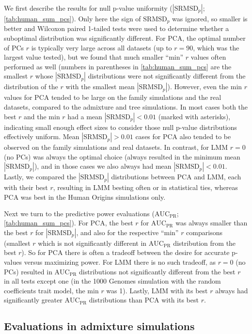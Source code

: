 \documentclass[11pt]{article}
\newcommand{\rmsd}{\text{SRMSD}_p}
\newcommand{\auc}{\text{AUC}_\text{PR}}
\begin{document}
We first describe the results for null p-value uniformity ($|\rmsd|$; \cref{tab:human_sum_pcs}).
Only here the sign of $\rmsd$ was ignored, so smaller is better and Wilcoxon paired 1-tailed tests were used to determine whether a suboptimal distribution was significantly different.
For PCA, the optimal number of PCs $r$ is typically very large across all datasets (up to $r=90$, which was the largest value tested), but we found that much smaller ``min'' $r$ values often performed as well (numbers in parentheses in \cref{tab:human_sum_pcs} are the smallest $r$ whose $|\rmsd|$ distributions were not significantly different from the distribution of the $r$ with the smallest mean $|\rmsd|$).
However, even the min $r$ values for PCA tended to be large on the family simulations and the real datasets, compared to the admixture and tree simulations.
In most cases both the best $r$ and the min $r$ had a mean $|\rmsd| < 0.01$ (marked with asterisks), indicating small enough effect sizes to consider those null p-value distributions effectively uniform.
Mean $|\rmsd| > 0.01$ cases for PCA also tended to be observed on the family simulations and real datasets.
In contrast, for LMM $r=0$ (no PCs) was always the optimal choice (always resulted in the minimum mean $|\rmsd|$), and in those cases we also always had mean $|\rmsd| < 0.01$.
Lastly, we compared the $|\rmsd|$ distributions between PCA and LMM, each with their best $r$, resulting in LMM besting often or in statistical ties, whereas PCA was best in the Human Origins simulations only.

Next we turn to the predictive power evaluations ($\auc$; \cref{tab:human_sum_pcs}).
For PCA, the best $r$ for $\auc$ was always smaller than the best $r$ for $|\rmsd|$, and also for the respective ``min'' $r$ comparisons (smallest $r$ which is not significantly different in $\auc$ distribution from the best $r$).
So for PCA there is often a tradeoff between the desire for accurate p-values versus maximizing power.
For LMM there is no such tradeoff, as $r=0$ (no PCs) resulted in $\auc$ distributions not significantly different from the best $r$ in all tests except one (in the 1000 Genomes simulation with the random coefficients trait model, the min $r$ was 1).
Lastly, LMM with its best $r$ always had significantly greater $\auc$ distributions than PCA with its best $r$.

\subsection{Evaluations in admixture simulations}
\end{document}
